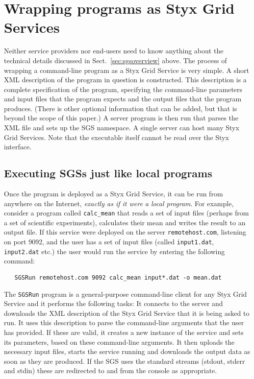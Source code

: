 \documentclass{article}
\begin{document}
\section{Wrapping programs as Styx Grid Services}\label{sec:wrapping}
Neither service providers nor end-users need to know anything about the technical details discussed in Sect.~\ref{sec:sgsoverview} above.  The process of wrapping a command-line program as a Styx Grid Service is very simple.  A short XML description of the program in question is constructed.  This description is a complete specification of the program, specifying the command-line parameters and input files that the program expects and the output files that the program produces.  (There is other optional information that can be added, but that is beyond the scope of this paper.)  A server program is then run that parses the XML file and sets up the SGS namespace.  A single server can host many Styx Grid Services.  Note that the executable itself cannot be read over the Styx interface.

\subsection{Executing SGSs just like local programs}

Once the program is deployed as a Styx Grid Service, it can be run from anywhere on the Internet, {\em exactly as if it were a local program\/}.  For example, consider a program called {\tt calc\_mean} that reads a set of input files (perhaps from a set of scientific experiments), calculates their mean and writes the result to an output file.  If this service were deployed on the server {\tt remotehost.com}, listening on port 9092, and the user has a set of input files (called {\tt input1.dat}, {\tt input2.dat} etc.) the user would run the service by entering the following command:

\begin{verbatim}
   SGSRun remotehost.com 9092 calc_mean input*.dat -o mean.dat
\end{verbatim}

The {\tt SGSRun} program is a general-purpose command-line client for any Styx Grid Service and it performs the following tasks:  It connects to the server and downloads the XML description of the Styx Grid Service that it is being asked to run.  It uses this description to parse the command-line arguments that the user has provided.  If these are valid, it creates a new instance of the service and sets its parameters, based on these command-line arguments.  It then uploads the necessary input files, starts the service running and downloads the output data as soon as they are produced.  If the SGS uses the standard streams (stdout, stderr and stdin) these are redirected to and from the console as appropriate.
\end{document}
